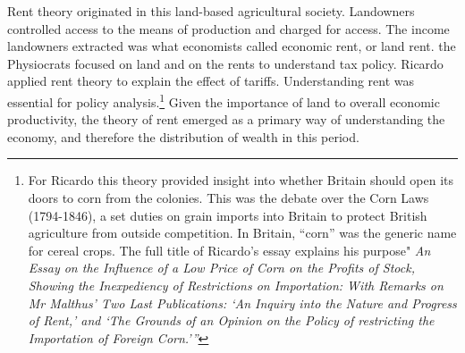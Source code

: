 Rent theory originated in this land-based agricultural society. Landowners controlled access to the means of production and charged for access. The income landowners extracted was what economists called \gls{economic rent}, or \gls{land rent}. the Physiocrats focused on land and on the rents to understand tax policy. Ricardo applied rent theory to  explain the effect of tariffs. Understanding rent was essential for policy analysis.\footnote{For Ricardo this theory provided insight into whether Britain should open its doors to corn from the colonies. This was the debate over the Corn Laws (1794-1846), a set duties on grain imports into Britain to protect British agriculture from outside competition. In Britain, ``corn'' was the generic name for cereal crops. The full title of Ricardo's essay explains his purpose" \textit{An Essay on the Influence of a Low Price of Corn on the Profits of Stock, Showing the Inexpediency of Restrictions on Importation: With Remarks on Mr Malthus' Two Last Publications: `An Inquiry into the Nature and Progress of Rent,' and `The Grounds of an Opinion on the Policy of restricting the Importation of Foreign Corn.'''}} 
Given the importance of land to overall economic productivity, the theory of rent emerged as a primary way of understanding the economy, and therefore the distribution of wealth in this period. 


